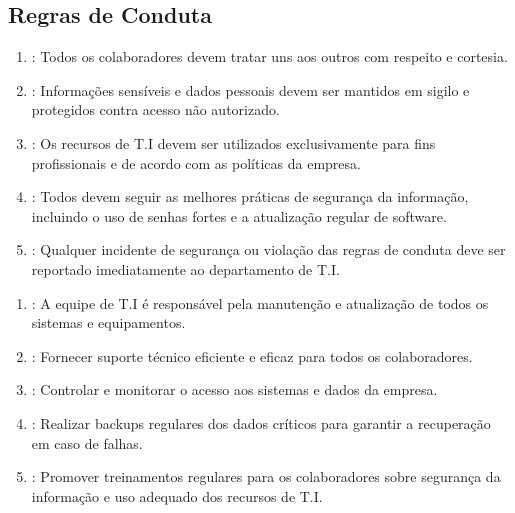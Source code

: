 \documentclass[a4paper,10pt,portuges]{sphinxmanual}
\begin{document}
\subsection{Regras de Conduta}
\label{\detokenize{regras:regras-de-conduta}}\begin{enumerate}
%
\item {} 
\sphinxAtStartPar
{}: Todos os colaboradores devem tratar uns aos outros com respeito e cortesia.

\item {} 
\sphinxAtStartPar
{}: Informações sensíveis e dados pessoais devem ser mantidos em sigilo e protegidos contra acesso não autorizado.

\item {} 
\sphinxAtStartPar
{}: Os recursos de T.I devem ser utilizados exclusivamente para fins profissionais e de acordo com as políticas da empresa.

\item {} 
\sphinxAtStartPar
{}: Todos devem seguir as melhores práticas de segurança da informação, incluindo o uso de senhas fortes e a atualização regular de software.

\item {} 
\sphinxAtStartPar
{}: Qualquer incidente de segurança ou violação das regras de conduta deve ser reportado imediatamente ao departamento de T.I.

\end{enumerate}
\begin{enumerate}
%
\item {} 
\sphinxAtStartPar
{}: A equipe de T.I é responsável pela manutenção e atualização de todos os sistemas e equipamentos.

\item {} 
\sphinxAtStartPar
{}: Fornecer suporte técnico eficiente e eficaz para todos os colaboradores.

\item {} 
\sphinxAtStartPar
{}: Controlar e monitorar o acesso aos sistemas e dados da empresa.

\item {} 
\sphinxAtStartPar
{}: Realizar backups regulares dos dados críticos para garantir a recuperação em caso de falhas.

\item {} 
\sphinxAtStartPar
{}: Promover treinamentos regulares para os colaboradores sobre segurança da informação e uso adequado dos recursos de T.I.

\end{enumerate}
\end{document}
